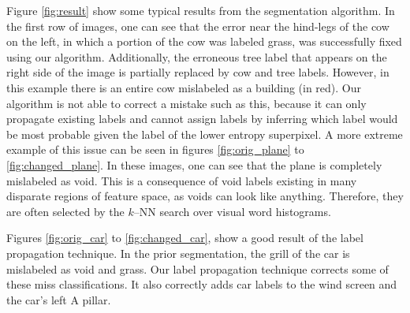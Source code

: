 \documentclass{article} %
\begin{document}
Figure \ref{fig:result} show some typical results from the segmentation algorithm. In the first row of images, one can see that the error near the hind-legs of the cow on the left, in which a portion of the cow was labeled grass, was successfully fixed using our algorithm. Additionally, the erroneous tree label that appears on the right side of the image is partially replaced by cow and tree labels. However, in this example there is an entire cow mislabeled as a building (in red). Our algorithm is not able to correct a mistake such as this, because it can only propagate existing labels and cannot assign labels by inferring which label would be most probable given the label of the lower entropy superpixel. A more extreme example of this issue can be seen in figures \ref{fig:orig_plane} to \ref{fig:changed_plane}. In these images, one can see that the plane is completely mislabeled as void. This is a consequence of void labels existing in many disparate regions of feature space, as voids can look like anything. Therefore, they are often selected by the $k$--NN search over visual word histograms.

Figures \ref{fig:orig_car} to \ref{fig:changed_car}, show a good result of the label propagation technique. In the prior segmentation, the grill of the car is mislabeled as void and grass. Our label propagation technique corrects some of these miss classifications. It also correctly adds car labels to the wind screen and the car's left A pillar.
\end{document}

